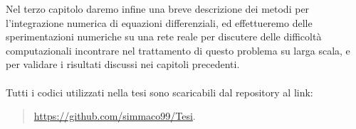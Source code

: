 \documentclass[12pt,a4paper,twoside]{report}
\begin{document}
Nel terzo capitolo daremo infine una breve descrizione dei metodi per l'integrazione numerica di equazioni differenziali, ed effettueremo delle sperimentazioni numeriche su una rete reale per discutere delle difficolt\`a computazionali incontrare nel trattamento di questo problema su larga scala, e per validare i risultati discussi nei capitoli precedenti.\\ \\
Tutti i codici utilizzati nella tesi sono scaricabili dal  repository al link:
\begin{quote}
\url{https://github.com/simmaco99/Tesi}.
\end{quote}














\cleardoublepage
\listoffigures
{}
\listoftables
{}
\cleardoublepage
\tableofcontents
\end{document}
